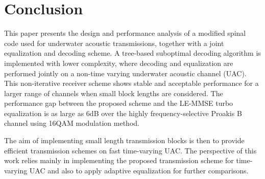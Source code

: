 \documentclass[conference]{IEEEtran}
\begin{document}

\section{Conclusion} \label{sec:conclusion}
This paper presents the design and performance analysis of a modified spinal code used for underwater acoustic transmissions, together with a joint equalization and decoding scheme. A tree-based suboptimal decoding algorithm is implemented with lower complexity, where decoding and equalization are performed jointly on a non-time varying underwater acoustic channel (UAC). This non-iterative receiver scheme shows stable and acceptable performance for a larger range of channels when small block lengths are considered. The performance gap between the proposed scheme and the LE-MMSE turbo equalization is as large as 6dB over the highly frequency-selective Proakis B channel using 16QAM modulation method. 

The aim of implementing small length transmission blocks is then to provide efficient transmission schemes on fast time-varying UAC. The perspective of this work relies mainly in implementing the proposed transmission scheme for time-varying UAC and also to apply adaptive equalization for further comparisons.









\end{document}

